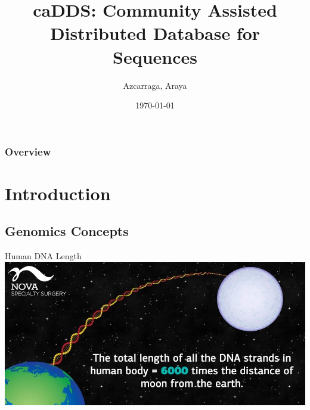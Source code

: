 \documentclass{beamer}
\title[caDDS]{caDDS: Community Assisted Distributed Database for Sequences}
\author{Azcarraga, Araya} %
\institute[Department of Computer Science, University of the Philippine - Diliman] %
{
University of the Philippine - Diliman\\ %
\medskip
}
\date{\today} %
\begin{document}
\begin{frame}
\titlepage %
\end{frame}


\begin{frame}
\frametitle{Overview} %
\tableofcontents %
\end{frame}


\section{Introduction}
\subsection{Genomics Concepts}

\begin{frame}{Human DNA Length}
    \centering
    \includegraphics[scale=0.3]{dna-length.jpg}
\end{frame}
\end{document}

